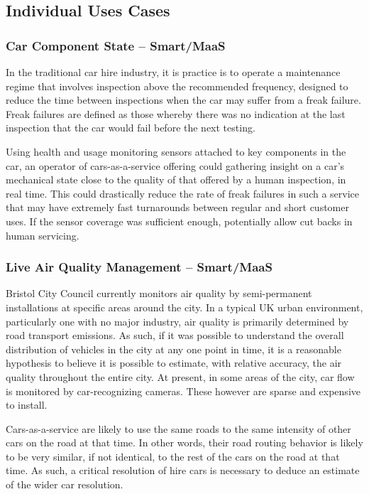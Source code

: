 \documentclass[journal]{IEEEtran}
\begin{document}
\subsection{Individual Uses Cases}

\subsubsection{Car Component State -- Smart/MaaS}

In the traditional car hire industry, it is practice is to operate a
maintenance regime that involves inspection above the recommended
frequency, designed to reduce the time between inspections when the
car may suffer from a freak failure. Freak failures are defined as
those whereby there was no indication at the last inspection that the
car would fail before the next testing.

Using health and usage monitoring sensors attached to key components
in the car, an operator of cars-as-a-service offering could gathering
insight on a car's mechanical state close to the quality of that
offered by a human inspection, in real time. This could drastically
reduce the rate of freak failures in such a service that may have
extremely fast turnarounds between regular and short customer uses. If
the sensor coverage was sufficient enough, potentially allow cut backs
in human servicing.

\subsubsection{Live Air Quality Management -- Smart/MaaS}

Bristol City Council currently monitors air quality by semi-permanent
installations at specific areas around the city. In a typical UK urban
environment, particularly one with no major industry, air quality is
primarily determined by road transport emissions. As such, if it was
possible to understand the overall distribution of vehicles in the
city at any one point in time, it is a reasonable hypothesis to
believe it is possible to estimate, with relative accuracy, the air
quality throughout the entire city. At present, in some areas of the
city, car flow is monitored by car-recognizing cameras. These however
are sparse and expensive to install.

Cars-as-a-service are likely to use the same roads to the same
intensity of other cars on the road at that time. In other words,
their road routing behavior is likely to be very similar, if not
identical, to the rest of the cars on the road at that time. As such,
a critical resolution of hire cars is necessary to deduce an estimate
of the wider car resolution. 
\end{document}
